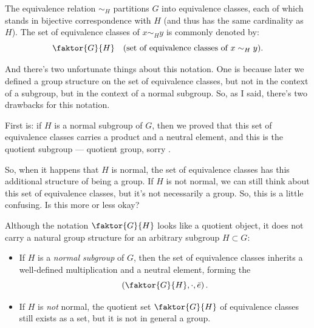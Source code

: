 \begin{content}
The equivalence relation $\sim_H$ partitions $G$ into equivalence classes, each of which stands in bijective correspondence with $H$ (and thus has the same cardinality as $H$). The set of equivalence classes of $x \sim_H y$ is commonly denoted by:
\[
\faktor{G}{H} \quad \text{(set of equivalence classes of } x \sim_H y\text{)}.
\]
\end{content}

\begin{speech}[00:01:51 - 00:02:53]
And there's two unfortunate things about this notation. One is because later we defined a group structure on the set of equivalence classes, but not in the context of a subgroup, but in the context of a normal subgroup. So, as I said, there's two drawbacks for this notation.

First is: if $H$ is a normal subgroup of $G$, then we proved that this set of equivalence classes carries a product and a neutral element, and this is the quotient subgroup --- quotient group, sorry .

So, when it happens that $H$ is normal, the set of equivalence classes has this additional structure of being a group. If $H$ is not normal, we can still think about this set of equivalence classes, but it's not necessarily a group. So, this is a little confusing. Is this more or less okay?
\end{speech}

\begin{content}
Although the notation $\faktor{G}{H}$ looks like a quotient object, it does not carry a natural group structure for an arbitrary subgroup $H \subset G$:
\begin{itemize}
    \item If $H$ is a \emph{normal subgroup} of $G$, then the set of equivalence classes inherits a well-defined multiplication and a neutral element, forming the 
    \[
    \left(\faktor{G}{H}, \cdot, \bar{e}\right).
    \]
    \item If $H$ is \emph{not} normal, the quotient set $\faktor{G}{H}$ of equivalence classes still exists as a set, but it is not in general a group.
\end{itemize}
\end{content}

